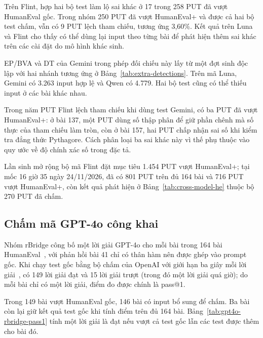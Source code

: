 Trên Flint, hợp hai bộ test làm lộ sai khác ở 17 trong 258 PUT đã vượt HumanEval gốc. Trong nhóm 250 PUT đã vượt HumanEval+ và được cả hai bộ test chấm, vẫn có 9 PUT lệch tham chiếu, tương ứng 3,60\%. Kết quả trên Luna và Flint cho thấy có thể dùng lại input theo từng bài để phát hiện thêm sai khác trên các cài đặt do mô hình khác sinh.

EP/BVA và DT của Gemini trong phép đối chiếu này lấy từ một đợt sinh độc lập với hai nhánh tương ứng ở Bảng~\ref{tab:extra-detections}. Trên mã Luna, Gemini có 3.263 input hợp lệ và Qwen có 4.779. Hai bộ test cũng có thể thiếu input ở các bài khác nhau.

Trong năm PUT Flint lệch tham chiếu khi dùng test Gemini, có ba PUT đã vượt HumanEval+: ở bài 137, một PUT dùng số thập phân để giữ phần chênh mà số thực của tham chiếu làm tròn, còn ở bài 157, hai PUT chấp nhận sai số khi kiểm tra đẳng thức Pythagore. Cách phân loại ba sai khác này vì thế phụ thuộc vào quy ước về độ chính xác số trong đặc tả.

Lần sinh mở rộng bộ mã Flint đặt mục tiêu 1.454 PUT vượt HumanEval+; tại mốc 16 giờ 35 ngày 24/11/2026, đã có 801 PUT trên đủ 164 bài và 716 PUT vượt HumanEval+, còn kết quả phát hiện ở Bảng~\ref{tab:cross-model-he} thuộc bộ 270 PUT đã chấm.

\subsection{Chấm mã GPT-4o công khai}
\label{sec:gpt4o-evaluation}

Nhóm rBridge công bố một lời giải GPT-4o cho mỗi bài trong 164 bài HumanEval~\cite{rbridgeDataset}, với phản hồi bài 41 chỉ có thân hàm nên được ghép vào prompt gốc. Khi chạy test gốc bằng bộ chấm của OpenAI với giới hạn ba giây mỗi lời giải~\cite{openaiHumanEvalScoring}, có 149 lời giải đạt và 15 lời giải trượt (trong đó một lời giải quá giờ); do mỗi bài chỉ có một lời giải, điểm đo được chính là pass@1.

Trong 149 bài vượt HumanEval gốc, 146 bài có input bổ sung để chấm. Ba bài còn lại giữ kết quả test gốc khi tính điểm trên đủ 164 bài. Bảng~\ref{tab:gpt4o-rbridge-pass1} tính một lời giải là đạt nếu vượt cả test gốc lẫn các test được thêm cho bài đó.

